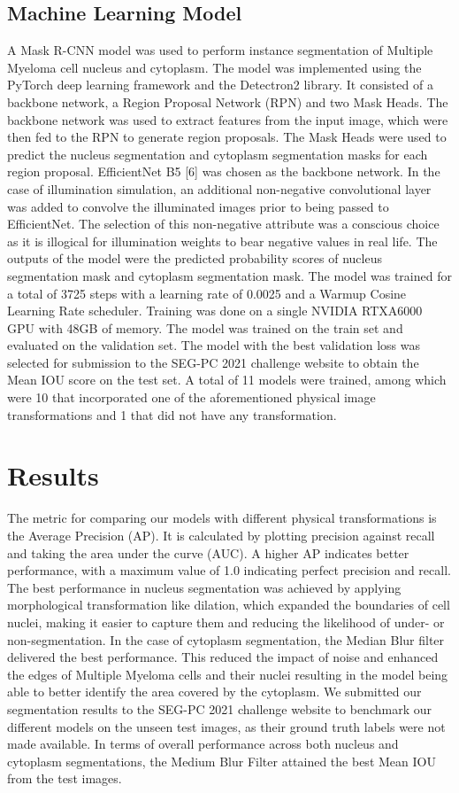 \documentclass{article}
\begin{document}
\subsection{Machine Learning Model}

A Mask R-CNN model was used to perform instance segmentation of Multiple Myeloma cell nucleus and cytoplasm. The model was implemented using the PyTorch deep learning framework and the Detectron2 library. It consisted of a backbone network, a Region Proposal Network (RPN) and two Mask Heads. The backbone network was used to extract features from the input image, which were then fed to the RPN to generate region proposals. The Mask Heads were used to predict the nucleus segmentation and cytoplasm segmentation masks for each region proposal. EfficientNet B5 [6] was chosen as the backbone network. In the case of illumination simulation, an additional non-negative convolutional layer was added to convolve the illuminated images prior to being passed to EfficientNet. The selection of this non-negative attribute was a conscious choice as it is illogical for illumination weights to bear negative values in real life. The outputs of the model were the predicted probability scores of nucleus segmentation mask and cytoplasm segmentation mask. The model was trained for a total of 3725 steps with a learning rate of 0.0025 and a Warmup Cosine Learning Rate scheduler. Training was done on a single NVIDIA RTXA6000 GPU with 48GB of memory. The model was trained on the train set and evaluated on the validation set. The model with the best validation loss was selected for submission to the SEG-PC 2021 challenge website to obtain the Mean IOU score on the test set. A total of 11 models were trained, among which were 10 that incorporated one of the aforementioned physical image transformations and 1 that did not have any transformation.

\section{Results}

The metric for comparing our models with different physical transformations is the Average Precision (AP). It is calculated by plotting precision against recall and taking the area under the curve (AUC). A higher AP indicates better performance, with a maximum value of 1.0 indicating perfect precision and recall. The best performance in nucleus segmentation was achieved by applying morphological transformation like dilation, which expanded the boundaries of cell nuclei, making it easier to capture them and reducing the likelihood of under- or non-segmentation. In the case of cytoplasm segmentation, the Median Blur filter delivered the best performance. This reduced the impact of noise and enhanced the edges of Multiple Myeloma cells and their nuclei resulting in the model being able to better identify the area covered by the cytoplasm. We submitted our segmentation results to the SEG-PC 2021 challenge website to benchmark our different models on the unseen test images, as their ground truth labels were not made available. In terms of overall performance across both nucleus and cytoplasm segmentations, the Medium Blur Filter attained the best Mean IOU from the test images.
\end{document}

